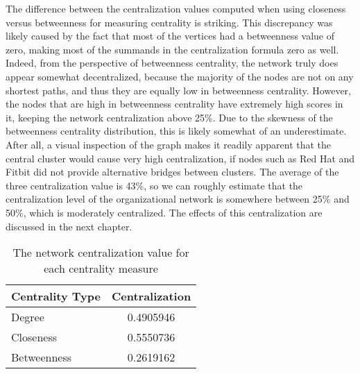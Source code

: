 The difference between the centralization values computed when using closeness versus betweenness for measuring centrality is striking. This discrepancy was likely caused by the fact that most of the vertices had a betweenness value of zero, making most of the summands in the centralization formula zero as well. Indeed, from the perspective of betweenness centrality, the network truly does appear somewhat decentralized, because the majority of the nodes are not on any shortest paths, and thus they are equally low in betweenness centrality. However, the nodes that are high in betweenness centrality have extremely high scores in it, keeping the network centralization above 25\%. Due to the skewness of the betweenness centrality distribution, this is likely somewhat of an underestimate. After all, a visual inspection of the graph makes it readily apparent that the central cluster would cause very high centralization, if nodes such as Red Hat and Fitbit did not provide alternative bridges between clusters. The average of the three centralization value is 43\%, so we can roughly estimate that the centralization level of the organizational network is somewhere between 25\% and 50\%, which is moderately centralized. The effects of this centralization are discussed in the next chapter.

\begin{table}
	\begin{tabular}{l|c}
		\bfseries Centrality Type & \bfseries Centralization \\
		\hline
		Degree & 0.4905946 \\
		\hline
		Closeness & 0.5550736 \\
		\hline
		Betweenness & 0.2619162
	\end{tabular}
	\centering
	\caption{The network centralization value for each centrality measure}\label{tab:centralization}
\end{table}

